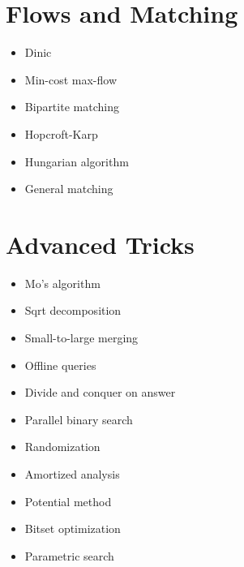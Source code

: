 \section*{Flows and Matching}

\begin{itemize}
  \item Dinic
  \item Min-cost max-flow
  \item Bipartite matching
  \item Hopcroft-Karp
  \item Hungarian algorithm
  \item General matching
\end{itemize}

\section*{Advanced Tricks}

\begin{itemize}
  \item Mo's algorithm
  \item Sqrt decomposition
  \item Small-to-large merging
  \item Offline queries
  \item Divide and conquer on answer
  \item Parallel binary search
  \item Randomization
  \item Amortized analysis
  \item Potential method
  \item Bitset optimization
  \item Parametric search
\end{itemize}
